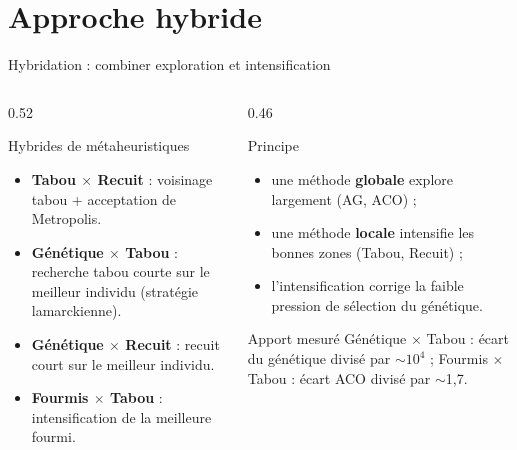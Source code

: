 \section{Approche hybride}

\begin{frame}{Hybridation : combiner exploration et intensification}
  \footnotesize
  \begin{columns}[T,onlytextwidth]
    \begin{column}{0.52\textwidth}
      \begin{block}{Hybrides de métaheuristiques}
        \begin{itemize}
          \item \textbf{Tabou $\times$ Recuit} : voisinage tabou + acceptation
            de Metropolis.
          \item \textbf{Génétique $\times$ Tabou} : recherche tabou courte sur
            le meilleur individu (stratégie lamarckienne).
          \item \textbf{Génétique $\times$ Recuit} : recuit court sur le
            meilleur individu.
          \item \textbf{Fourmis $\times$ Tabou} : intensification de la
            meilleure fourmi.
        \end{itemize}
      \end{block}
    \end{column}
    \begin{column}{0.46\textwidth}
      \begin{exampleblock}{Principe}
        \footnotesize
        \begin{itemize}
          \item une méthode \textbf{globale} explore largement (AG, ACO) ;
          \item une méthode \textbf{locale} intensifie les bonnes zones
            (Tabou, Recuit) ;
          \item l'intensification corrige la faible pression de sélection du
            génétique.
        \end{itemize}
      \end{exampleblock}
      \begin{alertblock}{Apport mesuré}
        \footnotesize Génétique $\times$ Tabou : écart du génétique divisé par
        $\sim$$10^4$ ; Fourmis $\times$ Tabou : écart ACO divisé par
        $\sim$1,7.
      \end{alertblock}
    \end{column}
  \end{columns}
\end{frame}

